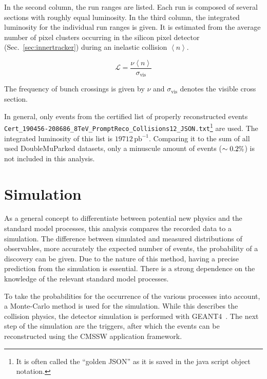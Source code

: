 In the second column, the run ranges are listed. Each run is composed of several sections with roughly equal luminosity. In the third column, the integrated luminosity for the individual run ranges is given. It is estimated from the average number of pixel clusters occurring in the silicon pixel detector (Sec.~\ref{sec:innertracker}) during an inelastic collision $\left< n \right>$.

\begin{equation}
  \label{eq:lumi}
  \mathcal{L} = \frac{\nu \left< n \right>}{\sigma_{\text{vis}}}
\end{equation}

\noindent The frequency of bunch crossings is given by $\nu$ and $\sigma_{\text{vis}}$ denotes the visible cross section. 

In general, only events from the certified list of properly reconstructed events \\ \verb+Cert_190456-208686_8TeV_PromptReco_Collisions12_JSON.txt+\footnote{It is often called the ``golden JSON'' as it is saved in the java script object notation.} are used. The integrated luminosity of this list is $19712\,\text{pb}^{-1}$. Comparing it to the sum of all used DoubleMuParked datasets, only a minuscule amount of events ($\sim 0.2\pct$) is not included in this analysis.

\section{Simulation}

As a general concept to differentiate between potential new physics and the standard model processes, this analysis compares the recorded data to a simulation. The difference between simulated and measured distributions of observables, more accurately the expected number of events, the probability of a discovery can be given. Due to the nature of this method, having a precise prediction from the simulation is essential. There is a strong dependence on the knowledge of the relevant standard model processes.

To take the probabilities for the occurrence of the various processes into account, a Monte-Carlo method is used for the simulation. While this describes the collision physics, the detector simulation is performed with \textsc{GEANT4}~\cite{geant41,geant42}. The next step of the simulation are the triggers, after which the events can be reconstructed using the \textsc{CMSSW} application framework.


